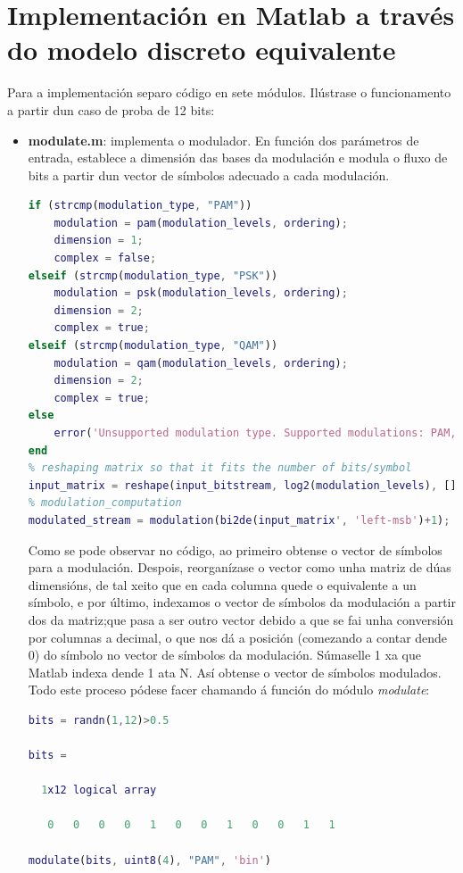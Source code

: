 \documentclass[
	10pt, %
	spanish, %
]{fphw}
\begin{document}
\section*{Implementación en Matlab a través do modelo discreto equivalente}
Para a implementación separo código en sete módulos. Ilústrase o funcionamento a partir dun caso de proba de 12 bits:
\begin{itemize}
\item \textbf{modulate.m}: implementa o modulador. En función dos parámetros de entrada, establece a dimensión das bases da modulación e modula o fluxo de bits a partir dun vector de símbolos adecuado a cada modulación. 
\begin{lstlisting}[language=matlab]
% modulation type checking and modulation computation
if (strcmp(modulation_type, "PAM"))
	modulation = pam(modulation_levels, ordering);
	dimension = 1;
	complex = false;
elseif (strcmp(modulation_type, "PSK"))
	modulation = psk(modulation_levels, ordering);
	dimension = 2;
	complex = true;
elseif (strcmp(modulation_type, "QAM"))
	modulation = qam(modulation_levels, ordering);
	dimension = 2;
	complex = true;
else
	error('Unsupported modulation type. Supported modulations: PAM, PSK, QAM');
end
% reshaping matrix so that it fits the number of bits/symbol
input_matrix = reshape(input_bitstream, log2(modulation_levels), []);
% modulation_computation
modulated_stream = modulation(bi2de(input_matrix', 'left-msb')+1);
\end{lstlisting}
Como se pode observar no código, ao primeiro obtense o vector de símbolos para a modulación. Despois, reorganízase o vector como unha matriz de dúas dimensións, de tal xeito que en cada columna quede o equivalente a un símbolo, e por último, indexamos o vector de símbolos da modulación a partir dos da matriz;que pasa a ser outro vector debido a que se fai unha conversión por columnas a decimal, o que nos dá a posición (comezando a contar dende 0) do símbolo no vector de símbolos da modulación. Súmaselle 1 xa que Matlab indexa dende 1 ata N. Así obtense o vector de símbolos modulados. Todo este proceso pódese facer chamando á función do módulo \textit{modulate}:
\begin{lstlisting}[language=matlab]
bits = randn(1,12)>0.5

bits =

  1x12 logical array

   0   0   0   0   1   0   0   1   0   0   1   1

modulate(bits, uint8(4), "PAM", 'bin')


\end{lstlisting}
\end{itemize}
\end{document}
